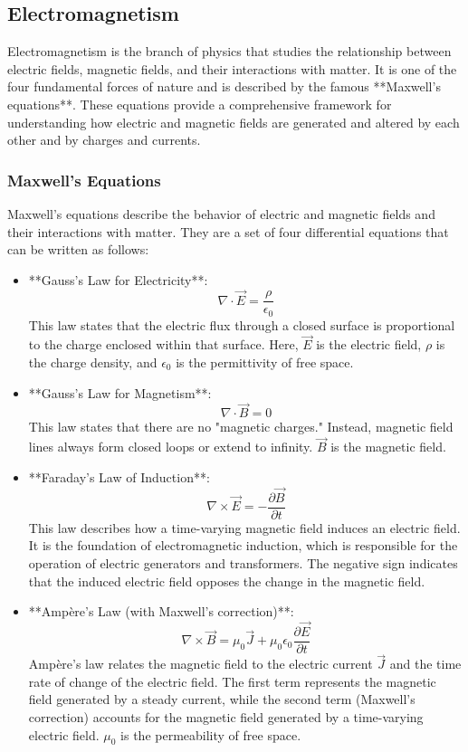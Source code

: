 \documentclass{article}
\begin{document}
\subsection{Electromagnetism}

Electromagnetism is the branch of physics that studies the relationship between electric fields, magnetic fields, and their interactions with matter. It is one of the four fundamental forces of nature and is described by the famous **Maxwell's equations**. These equations provide a comprehensive framework for understanding how electric and magnetic fields are generated and altered by each other and by charges and currents.

\subsubsection*{Maxwell's Equations}

Maxwell's equations describe the behavior of electric and magnetic fields and their interactions with matter. They are a set of four differential equations that can be written as follows:

\begin{itemize}
    \item **Gauss's Law for Electricity**:
    \[
    \nabla \cdot \vec{E} = \frac{\rho}{\epsilon_0}
    \]
    This law states that the electric flux through a closed surface is proportional to the charge enclosed within that surface. Here, \( \vec{E} \) is the electric field, \( \rho \) is the charge density, and \( \epsilon_0 \) is the permittivity of free space.
    
    \item **Gauss's Law for Magnetism**:
    \[
    \nabla \cdot \vec{B} = 0
    \]
    This law states that there are no "magnetic charges." Instead, magnetic field lines always form closed loops or extend to infinity. \( \vec{B} \) is the magnetic field.

    \item **Faraday's Law of Induction**:
    \[
    \nabla \times \vec{E} = -\frac{\partial \vec{B}}{\partial t}
    \]
    This law describes how a time-varying magnetic field induces an electric field. It is the foundation of electromagnetic induction, which is responsible for the operation of electric generators and transformers. The negative sign indicates that the induced electric field opposes the change in the magnetic field.

    \item **Ampère's Law (with Maxwell's correction)**:
    \[
    \nabla \times \vec{B} = \mu_0 \vec{J} + \mu_0 \epsilon_0 \frac{\partial \vec{E}}{\partial t}
    \]
    Ampère's law relates the magnetic field to the electric current \( \vec{J} \) and the time rate of change of the electric field. The first term represents the magnetic field generated by a steady current, while the second term (Maxwell’s correction) accounts for the magnetic field generated by a time-varying electric field. \( \mu_0 \) is the permeability of free space.

\end{itemize}
\end{document}
